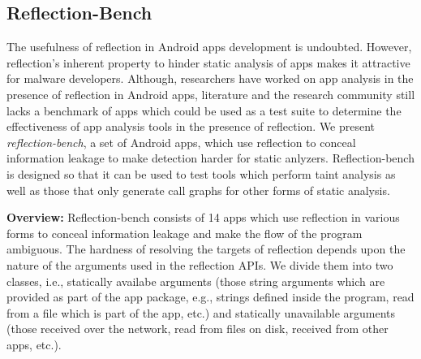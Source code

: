 \subsection{Reflection-Bench}
\label{refbench}

The usefulness of reflection in Android apps development is undoubted. However, reflection's inherent property to hinder static analysis of apps makes it attractive for malware developers. Although, researchers have worked on app analysis in the presence of reflection in Android apps, literature and the research community still lacks a benchmark of apps which could be used as a test suite to determine the effectiveness of app analysis tools in the presence of reflection. We present \emph{reflection-bench}, a set of Android apps, which use reflection to conceal information leakage to make detection harder for static anlyzers. Reflection-bench is designed so that it can be used to test tools which perform taint analysis as well as those that only generate call graphs for other forms of static analysis.



\iffalse
\begin{itemize}
  \item Model
  \todo[inline]{A basic high level picture}
  \item Design and Implementation
  \todo[inline]{Design and implementation details of individual apps in the benchmark}
  \item State-of-the-art Static analysis tools
  \todo[inline]{Overview of tools considered for analysis}
  \item Analysis results
  \todo[inline]{Results of the analysis tools on individual apps in the benchmark}
\end{itemize}
\fi

\textbf{Overview:} Reflection-bench consists of 14 apps which use reflection in various forms to conceal information leakage and make the flow of the program ambiguous. %
The hardness of resolving the targets of reflection depends upon the nature of the arguments used in the reflection APIs. We divide them into two classes,  i.e., statically availabe arguments (those string arguments which are provided as part of the app package, e.g., strings defined inside the program, read from a file which is part of the app, etc.) and statically unavailable arguments (those received over the network, read from files on disk, received from other apps, etc.).

